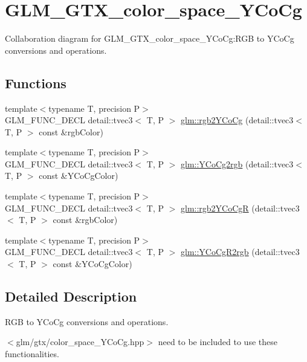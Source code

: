 \hypertarget{group__gtx__color__space___y_co_cg}{
\section{GLM\_\-GTX\_\-color\_\-space\_\-YCoCg}
\label{group__gtx__color__space___y_co_cg}
}


Collaboration diagram for GLM\_\-GTX\_\-color\_\-space\_\-YCoCg:RGB to YCoCg conversions and operations.  
\subsection*{Functions}
\begin{CompactItemize}
\item 
{\footnotesize template$<$typename T, precision P$>$ }\\GLM\_\-FUNC\_\-DECL detail::tvec3$<$ T, P $>$ \hyperlink{group__gtx__color__space___y_co_cg_gfd5ca4a311e055d522c031650e528b02}{glm::rgb2YCoCg} (detail::tvec3$<$ T, P $>$ const \&rgbColor)
\item 
{\footnotesize template$<$typename T, precision P$>$ }\\GLM\_\-FUNC\_\-DECL detail::tvec3$<$ T, P $>$ \hyperlink{group__gtx__color__space___y_co_cg_g68b8a9930f61718c6e819245e04f52a1}{glm::YCoCg2rgb} (detail::tvec3$<$ T, P $>$ const \&YCoCgColor)
\item 
{\footnotesize template$<$typename T, precision P$>$ }\\GLM\_\-FUNC\_\-DECL detail::tvec3$<$ T, P $>$ \hyperlink{group__gtx__color__space___y_co_cg_gda2dcb113c669093c7099dc58f26fb7c}{glm::rgb2YCoCgR} (detail::tvec3$<$ T, P $>$ const \&rgbColor)
\item 
{\footnotesize template$<$typename T, precision P$>$ }\\GLM\_\-FUNC\_\-DECL detail::tvec3$<$ T, P $>$ \hyperlink{group__gtx__color__space___y_co_cg_gecf0b1d1103554b9ec4e274f8284f7ad}{glm::YCoCgR2rgb} (detail::tvec3$<$ T, P $>$ const \&YCoCgColor)
\end{CompactItemize}


\subsection{Detailed Description}
RGB to YCoCg conversions and operations. 

$<$glm/gtx/color\_\-space\_\-YCoCg.hpp$>$ need to be included to use these functionalities. 


